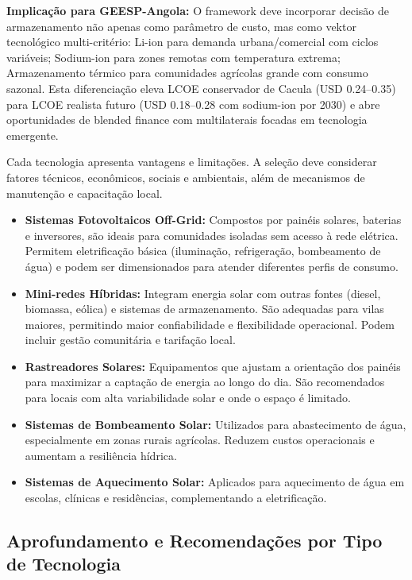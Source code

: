 \documentclass[12pt, a4paper]{article}
\begin{document}
\noindent \textbf{Implicação para GEESP-Angola:} O framework deve incorporar decisão de armazenamento não apenas como parâmetro de custo, mas como vektor tecnológico multi-critério: Li-ion para demanda urbana/comercial com ciclos variáveis; Sodium-ion para zones remotas com temperatura extrema; Armazenamento térmico para comunidades agrícolas grande com consumo sazonal. Esta diferenciação eleva LCOE conservador de Cacula (USD 0.24--0.35) para LCOE realista futuro (USD 0.18--0.28 com sodium-ion por 2030) e abre oportunidades de blended finance com multilaterais focadas em tecnologia emergente.

Cada tecnologia apresenta vantagens e limitações. A seleção deve considerar fatores técnicos, econômicos, sociais e ambientais, além de mecanismos de manutenção e capacitação local.

\begin{itemize}
  \item \textbf{Sistemas Fotovoltaicos Off-Grid:} Compostos por painéis solares, baterias e inversores, são ideais para comunidades isoladas sem acesso à rede elétrica. Permitem eletrificação básica (iluminação, refrigeração, bombeamento de água) e podem ser dimensionados para atender diferentes perfis de consumo.
  \item \textbf{Mini-redes Híbridas:} Integram energia solar com outras fontes (diesel, biomassa, eólica) e sistemas de armazenamento. São adequadas para vilas maiores, permitindo maior confiabilidade e flexibilidade operacional. Podem incluir gestão comunitária e tarifação local.
  \item \textbf{Rastreadores Solares:} Equipamentos que ajustam a orientação dos painéis para maximizar a captação de energia ao longo do dia. São recomendados para locais com alta variabilidade solar e onde o espaço é limitado.
  \item \textbf{Sistemas de Bombeamento Solar:} Utilizados para abastecimento de água, especialmente em zonas rurais agrícolas. Reduzem custos operacionais e aumentam a resiliência hídrica.
  \item \textbf{Sistemas de Aquecimento Solar:} Aplicados para aquecimento de água em escolas, clínicas e residências, complementando a eletrificação.
\end{itemize}

\subsection{Aprofundamento e Recomendações por Tipo de Tecnologia}
\end{document}
